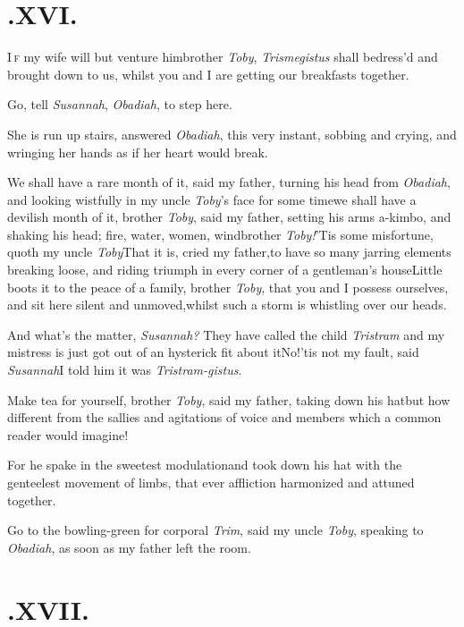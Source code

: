 \documentclass{article}
\begin{document}
\bigskip
\section{.\enspace XVI.}

\lettrine{I}{\,f} my wife will but venture
him\tsk brother \textit{Toby}, \textit{Trismegistus} shall
be\break dress’d
and brought down to us, whilst you and I are getting our breakfasts
together.\tsk

\tsk Go, tell \textit{Susannah}, \textit{Obadiah}, to step
here.

She is run up stairs, answered \textit{Obadiah}, this very
instant, sobbing and crying, and wringing her hands as if her heart
would break.\tsh{}

We shall have a rare month of it, said my father, turning his
head from \textit{Obadiah}, and looking wistfully in my uncle
\textit{Toby}’s face for some time\tsk we shall have a
devilish month of it, brother \textit{Toby}, said my father, setting
his arms a-kimbo, and shaking his head; fire, water, women,
wind\tsk brother \textit{Toby!}\tsk ’Tis some misfortune,
quoth my uncle \textit{Toby}\tsk That it is, cried my
father,\tsk to have so many jarring elements breaking loose, and
riding triumph in every corner of a gentleman’s house\tsk Little boots it to the peace
of a family, brother \textit{Toby}, that you and I possess ourselves,
and sit here silent and unmoved,\tsh whilst such a storm is
whistling over our heads.\tsh

And what’s the matter, \textit{Susannah?}\break
They have called the child \textit{Tristram}\tsh\break
and my mistress is just got out of an
hysterick fit about
it\tsk No!\tsk ’tis not my fault, said
\textit{Susannah}\tsk I told him it was \textit{Tristram-gistus}.

\tsh Make tea for yourself, brother \textit{Toby}, said
my father, taking down his hat\tsk but how different from
the sallies and agitations of voice and members which a common
reader would imagine!

\tsk For he spake in the sweetest modulation\tsk and took
down his hat with the genteelest movement of limbs, that ever
affliction harmonized and attuned together.

\tsh Go to the bowling-green for corporal \textit{Trim},
said my uncle \textit{Toby}, speaking to \textit{Obadiah}, as soon as
my father left the room.

\null\smallskip
\section{.\enspace XVII.}
\end{document}
